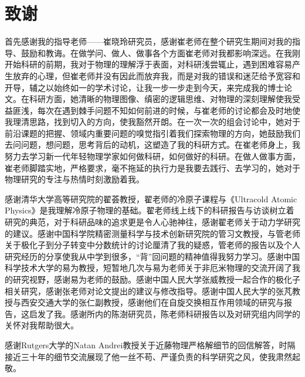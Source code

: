 

\chapter[致谢]{致\quad 谢}%

首先感谢我的指导老师——崔晓玲研究员，感谢崔老师在整个研究生期间对我的指导、鼓励和教诲。在做学问、做人、做事各个方面崔老师对我都影响深远。在我刚开始科研的前期，我对于物理的理解浮于表面，对科研浅尝辄止，遇到困难容易产生放弃的心理，但崔老师并没有因此而放弃我，而是对我的错误和迷茫给予宽容和开导，辅之以始终如一的学术讨论，让我一步一步走到今天，来完成我的博士论文。在科研方面，她清晰的物理图像、缜密的逻辑思维、对物理的深刻理解使我受益匪浅，每次在遇到棘手问题不知如何前进的时候，与崔老师的讨论都会及时地使我理清思路，找到切入的方向，使我豁然开朗。在一次一次的组会讨论中，她对于前沿课题的把握、领域内重要问题的嗅觉指引着我们探索物理的方向，她鼓励我们去问问题，想问题，思考背后的动机，这塑造了我的科研方式。在崔老师身上，我努力去学习新一代年轻物理学家如何做科研，如何做好的科研。在做人做事方面，崔老师脚踏实地，严格要求，毫不拖延的执行力是我要去践行、去学习的，她对于物理研究的专注与热情时刻激励着我。

感谢清华大学高等研究院的翟荟教授，翟老师的冷原子课程与《Ultracold Atomic Physics》是我理解冷原子物理的基础。翟老师线上线下的科研报告与访谈树立着研究的典范，对于科研品味的追求更是令人心驰神往，感谢翟老师关于动力学研究的建议。感谢中国科学院精密测量科学与技术创新研究院的管习文教授，与管老师关于极化子到分子转变中分数统计的讨论厘清了我的疑惑，管老师的报告以及个人研究经历的分享使我从中学到很多，“背”回问题的精神值得我努力学习。感谢中国科学技术大学的易为教授，短暂地几次与易为老师关于非厄米物理的交流开阔了我的研究视野，感谢易为老师的鼓励。感谢中国人民大学张威教授一起合作的极化子相关研究，感谢张老师对论文提出的建议与修改指导。感谢中国人民大学的张芃教授与西安交通大学的张仁副教授，感谢他们在自旋交换相互作用领域的研究与报告，这启发了我。感谢所内的陈澍研究员，陈老师科研报告以及对研究组内同学的关怀对我帮助很大。

感谢Rutgers大学的Natan Andrei教授关于近藤物理严格解细节的回信解答，时隔接近三十年的细节交流展现了他一丝不苟、严谨负责的科学研究之风，使我肃然起敬。

